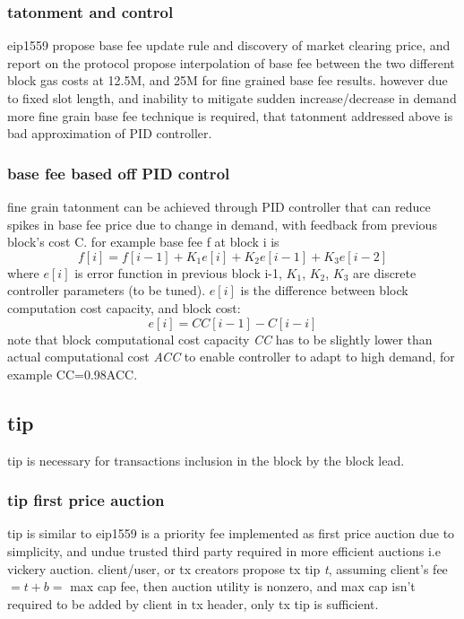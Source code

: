 \documentclass[a4paper]{article}
\begin{document}
\subsubsection{ tatonment and control}
eip1559 \cite{eip1559} propose base fee update rule and discovery of market clearing price, and report on the protocol \cite{eip1559_report} propose interpolation of base fee between the two different block gas costs at 12.5M, and 25M for fine grained base fee results.
however due to fixed slot length, and inability to mitigate sudden increase/decrease in demand more fine grain base fee technique is required, that tatonment addressed above is bad approximation of PID controller.

\subsubsection{ base fee based off PID control}
 fine grain tatonment can be achieved through PID controller that can reduce spikes in base fee price due to change in demand, with feedback from previous block's cost C.
 for example base fee f at block i is $$ f[i] = f[i-1] + K_1e[i] + K_2 e[i-1] + K_3e[i-2] $$
 where $e[i]$ is error function in previous block i-1, $K_1$, $K_2$, $K_3$ are discrete controller parameters (to be tuned).
 $e[i]$ is the difference between block computation cost capacity, and block cost:
 $$ e[i] = CC[i-1] - C[i-i]$$
 note that block computational cost capacity \emph{CC} has to be slightly lower than actual computational cost \emph{ACC} to enable controller to adapt to high demand, for example CC=0.98ACC.

 \subsection{tip}
 tip is necessary for transactions inclusion in the block by the block lead.

\subsubsection{ tip first price auction}
 tip is similar to eip1559 is a priority fee implemented as first price auction due to simplicity, and undue trusted third party required in more efficient auctions i.e vickery auction.
 client/user, or tx creators propose tx tip \emph{t}, assuming client's fee $ = t+b = $ max cap fee, then auction utility is nonzero, and max cap isn't required to be added by client in tx header, only tx tip is sufficient.
\end{document}
